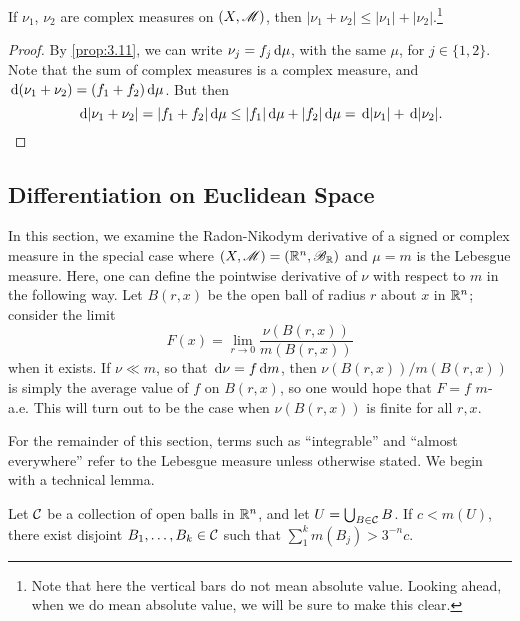 \documentclass[12pt]{article} %
\begin{document}
\begin{proposition}
    If $\nu_1$, $\nu_2$ are complex measures on $(X, \mathscr{M})$, then $|\nu_1 + \nu_2| \leq |\nu_1| + |\nu_2|$.\footnote{Note that here the vertical bars do not mean absolute value. Looking ahead, when we do mean absolute value, we will be sure to make this clear.}
\end{proposition}

\begin{proof}
    By \cref{prop:3.11}, we can write $\nu_j = f_j \, \mathrm{d}\mu$, with the same $\mu$, for $j \in \{1, 2\}$. Note that the sum of complex measures is a complex measure, and $\, \mathrm{d}(\nu_1 + \nu_2) = (f_1 + f_2)\, \mathrm{d}\mu$. But then \[\, \mathrm{d}|\nu_1 + \nu_2| = |f_1 + f_2|\, \mathrm{d}\mu \leq |f_1|\, \mathrm{d}\mu + |f_2|\, \mathrm{d}\mu = \, \mathrm{d}|\nu_1| + \, \mathrm{d}|\nu_2|.\]
\end{proof}

\subsection{Differentiation on Euclidean Space}

In this section, we examine the Radon-Nikodym derivative of a signed or complex measure in the special case where $(X, \mathscr{M}) = (\mathbb{R}^n, \mathscr{B}_{\mathbb{R}})$ and $\mu = m$ is the Lebesgue measure. Here, one can define the pointwise derivative of $\nu$ with respect to $m$ in the following way. Let $B(r, x)$ be the open ball of radius $r$ about $x$ in $\mathbb{R}^n$; consider the limit \[F(x) = \lim_{r \to 0} \frac{\nu(B(r, x))}{m(B(r,x))}\] when it exists. If $\nu \ll m$, so that $\, \mathrm{d}\nu = f\, \mathrm{d} m$, then $\nu(B(r, x))/m(B(r, x))$ is simply the average value of $f$ on $B(r, x)$, so one would hope that $F = f$ $m$-a.e. This will turn out to be the case when $\nu(B(r, x))$ is finite for all $r, x$. 

For the remainder of this section, terms such as ``integrable'' and ``almost everywhere'' refer to the Lebesgue measure unless otherwise stated. We begin with a technical lemma.

\begin{lemma}
    Let $\mathcal{C}$ be a collection of open balls in $\mathbb{R}^n$, and let $U = \bigcup_{B \in \mathcal{C}} B$. If $c < m(U)$, there exist disjoint $B_1, \ldots, B_k \in \mathcal{C}$ such that $\sum_1^k m(B_j) > 3^{-n}c$.
\end{lemma}
\end{document}
